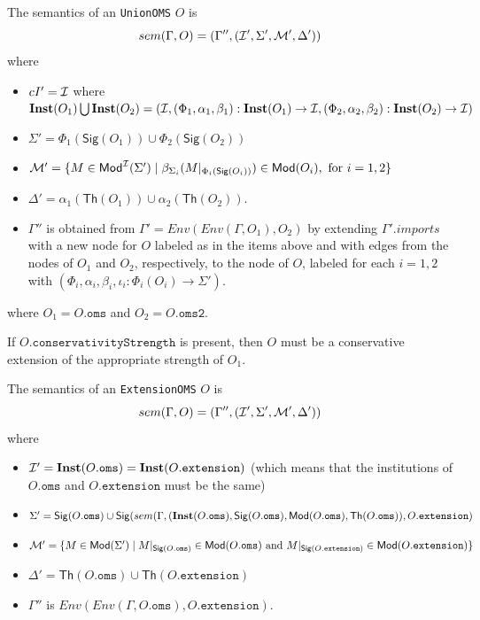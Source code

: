 \documentclass[10pt,fleqn,final]{scrreprt}
\newcommand*{\syntax}[1]{\texttt{#1}}
\newcommand{\Sig}{\mathsf{Sig}}
\renewcommand{\Th}{\mathsf{Th}}
\newcommand{\Inst}{\ensuremath{\mathbf{Inst}}}
\newenvironment{definitions}[0]{\medskip }{}
\begin{document}
\begin{definitions}
The semantics of an \syntax{UnionOMS} $O$ is
$$sem(\Gamma, O) = (\Gamma'',({\cal I}',\Sigma',{\cal M}',\Delta'))$$
\noindent where
\begin{itemize}
  \item $\\cI' = {\cal I}$ where
    $\Inst(O_1) \bigcup \Inst(O_2) =(\cI, (\Phi_1, \alpha_1,\beta_1) : \Inst(O_1) \rightarrow \cI, 
                    (\Phi_2, \alpha_2,\beta_2) : \Inst(O_2) \rightarrow \cI)$
  \item $\Sigma' = \Phi_1(\Sig(O_1)) \cup \Phi_2(\Sig(O_2))$
  \item $\cM' = \{ M\in \Mod^\cI(\Sigma') \mid \beta_{\Sigma_i}(M\forget{\Phi_i(\Sig(O_i))}) \in \Mod(O_i), \text{ for } i=1,2 \}$
  \item $\Delta' = \alpha_1(\Th(O_1)) \cup \alpha_2(\Th(O_2))$.
    \item 
        $\Gamma''$ is obtained from 
       $\Gamma' = Env(Env(\Gamma,O_1), O_2)$
       by extending $\Gamma'.imports$
       with a new node for $O$ labeled as in the items above and
       with edges from the nodes of $O_1$ and $O_2$,
       respectively, to the node of $O$,
        labeled for each $i=1,2$ with
        $(\Phi_i, \alpha_i,\beta_i, \iota_i: \Phi_i(O_i) \to \Sigma')$.
\end{itemize}
where $O_1 = O.\syntax{oms}$ and $O_2 = O.\syntax{oms2}$. 

If $O.\syntax{conservativityStrength}$ is present, then $O$ must be a conservative extension
of the appropriate strength of $O_1$.


The semantics of an \syntax{ExtensionOMS} $O$ is
$$sem(\Gamma, O) = (\Gamma'',({\cal I}',\Sigma',{\cal M}',\Delta'))$$
\noindent where
\begin{itemize}
  \item $\cI' = \Inst(O.\syntax{oms}) = \Inst(O.\syntax{extension})$ 
  (which means that
  the institutions of $O.\syntax{oms}$ and 
  $O.\syntax{extension}$ must be the same)
  \item $\Sigma' = \Sig(O.\syntax{oms}) \cup 
  \Sig(sem(\Gamma, 
       (\Inst(O.\syntax{oms}), \Sig(O.\syntax{oms}), \Mod(O.\syntax{oms}), \Th(O.\syntax{oms}) ),
  O.\syntax{extension})$
  \item $\cM' = \{ M\in \Mod(\Sigma') \mid M\forget{\Sig(O.\syntax{oms})} \in \Mod(O.\syntax{oms})
  \text{ and }
  M \forget{\Sig(O.\syntax{extension})} \in \Mod(O.\syntax{extension})\}$
  \item $\Delta' = \Th(O.\syntax{oms}) \cup \Th(O.\syntax{extension})$
  \item $\Gamma''$ is $Env(Env(\Gamma, O.\syntax{oms}), O.\syntax{extension})$.
\end{itemize}


\end{definitions}
\end{document}
